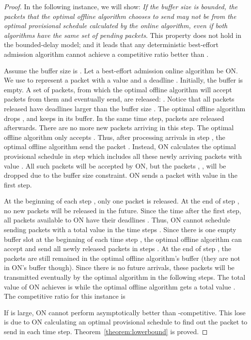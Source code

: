 \documentclass[final, 11pt]{article}
\begin{document}
\begin{proof}
In the following instance, we will show: {\em If the buffer size is bounded, the packets that the optimal offline algorithm chooses to send may not be from the optimal provisional schedule calculated by the online algorithm, even if both algorithms have the same set of pending packets}. This property does not hold in the bounded-delay model; and it leads that any deterministic best-effort admission algorithm cannot achieve a competitive ratio better than .

Assume the buffer size is . Let a best-effort admission online algorithm be ON. We use  to represent a packet  with a value  and a deadline . Initially, the buffer is empty.  A set of packets, from which the optimal offline algorithm will accept  packets from them and eventually send, are released: . Notice that all packets released have deadlines larger than the buffer size . The optimal offline algorithm drops , and keeps  in its buffer. In the same time step,  packets  are released afterwards. There are no more new packets arriving in this step. The optimal offline algorithm only accepts . Thus, after processing arrivals in step , the optimal offline algorithm send the packet . Instead, ON calculates the optimal provisional schedule in step  which includes all these newly arriving packets with value . All such packets will be accepted by ON, but the packets , , will be dropped due to the buffer size constraint. ON sends a packet with value  in the first step.

At the beginning of each step , only one packet  is released. At the end of step , no new packets will be released in the future. Since the time after the first step, all packets available to ON have their deadlines . Thus, ON cannot schedule sending packets with a total value  in the time steps . Since there is one empty buffer slot at the beginning of each time step , the optimal offline algorithm can accept and send all newly released packets  in steps . At the end of step , the packets  are still remained in the optimal offline algorithm's buffer (they are not in ON's buffer though). Since there is no future arrivals, these  packets will be transmitted eventually by the optimal algorithm in the following  steps. The total value of ON achieves is  while the optimal offline algorithm gets a total value . The competitive ratio for this instance is


If  is large, ON cannot perform asymptotically better than -competitive. This lose is due to ON calculating an optimal provisional schedule to find out the packet to send in each time step. Theorem~\ref{theorem:lowerbound} is proved. 
\end{proof}
\end{document}
